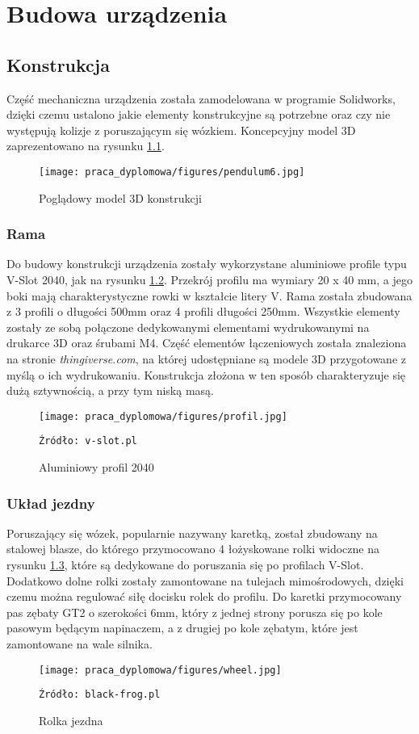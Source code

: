 \chapter{Budowa urządzenia}

\section{Konstrukcja}

Część mechaniczna urządzenia została zamodelowana w programie Solidworks, dzięki czemu ustalono jakie elementy konstrukcyjne są potrzebne oraz czy nie występują kolizje z poruszającym się wózkiem. Koncepcyjny model 3D zaprezentowano na rysunku \ref{fig:konstrukcja}. 

\begin{figure}
    \centering
    \texttt{[image: praca\_dyplomowa/figures/pendulum6.jpg]}
    \caption{Poglądowy model 3D konstrukcji}
    \label{fig:konstrukcja}
\end{figure}

\subsection{Rama}
Do budowy konstrukcji urządzenia zostały wykorzystane aluminiowe profile typu V-Slot 2040, jak na rysunku \ref{fig:profil}. Przekrój profilu ma wymiary 20 x 40 mm, a jego boki mają charakterystyczne rowki w kształcie litery V. Rama została zbudowana z 3 profili o długości 500mm oraz 4 profili długości 250mm. Wszystkie elementy zostały ze sobą połączone dedykowanymi elementami wydrukowanymi na drukarce 3D oraz śrubami M4. Część elementów łączeniowych została znaleziona na stronie \textit{thingiverse.com}, na której udostępniane są modele 3D przygotowane z myślą o ich wydrukowaniu. Konstrukcja złożona w ten sposób charakteryzuje się dużą sztywnością, a przy tym niską masą.

\begin{figure}
    \centering
    \texttt{[image: praca\_dyplomowa/figures/profil.jpg]}
    \caption{Aluminiowy profil 2040}
    \texttt{Źródło: v-slot.pl}
    \label{fig:profil}
\end{figure}

\subsection{Układ jezdny}
Poruszający się wózek, popularnie nazywany karetką, został zbudowany na stalowej blasze, do którego przymocowano 4 łożyskowane rolki widoczne na rysunku \ref{fig:Rolka}, które są dedykowane do poruszania się po profilach V-Slot. Dodatkowo dolne rolki zostały zamontowane na tulejach mimośrodowych, dzięki czemu można regulować siłę docisku rolek do profilu. Do karetki przymocowany pas zębaty GT2 o szerokości 6mm, który z jednej strony porusza się po kole pasowym będącym napinaczem, a z drugiej po kole zębatym, które jest zamontowane na wale silnika. 

\begin{figure}
    \centering
    \texttt{[image: praca\_dyplomowa/figures/wheel.jpg]}
    \caption{Rolka jezdna}
    \texttt{Źródło: black-frog.pl}
    \label{fig:Rolka}
\end{figure}
